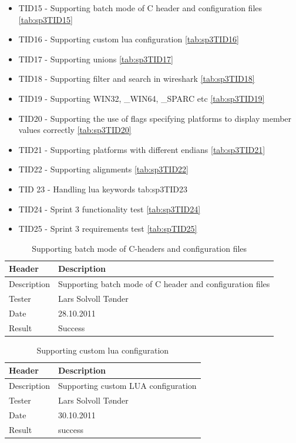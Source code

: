 \begin{itemize}
	\item TID15 - Supporting batch mode of C header and configuration files \autoref{tab:sp3TID15}
	\item TID16 - Supporting custom \Gls{lua} configuration \autoref{tab:sp3TID16}
	\item TID17 - Supporting unions \autoref{tab:sp3TID17}
	\item TID18 - Supporting filter and search in wireshark \autoref{tab:sp3TID18}
	\item TID19 - Supporting WIN32, \_WIN64, \_SPARC etc \autoref{tab:sp3TID19}
	\item TID20 -  Supporting the use of flags specifying platforms to display member values correctly \autoref{tab:sp3TID20}
	\item TID21 - Supporting platforms with different \glspl{endian} \autoref{tab:sp3TID21}
	\item TID22 - Supporting alignments \autoref{tab:sp3TID22}
	\item TID 23 - Handling \Gls{lua} keywords {tab:sp3TID23}
	\item TID24 - Sprint 3 functionality test \autoref{tab:sp3TID24}
	\item TID25 - Sprint 3 requirements test \autoref{tab:spTID25}
\end{itemize}

\begin{table}[!htb] \footnotesize \center
\caption{Supporting batch mode of C-headers and configuration files\label{tab:sp3TID15}}
\begin{tabular}{l l}
	\toprule
	Header & Description \\
	\midrule
	Description & Supporting batch mode of C header and configuration files \\
	Tester & Lars Solvoll Tønder \\
	Date & 28.10.2011 \\
	Result & Success\\
	\bottomrule
\end{tabular}
\end{table}

\begin{table}[!htb] \footnotesize \center
\caption{Supporting custom \Gls{lua} configuration\label{tab:sp3TID16}}
\begin{tabular}{l l}
	\toprule
	Header & Description \\
	\midrule
	Description & Supporting custom LUA configuration\\
	Tester & Lars Solvoll Tønder \\
	Date & 30.10.2011\\
	Result & success\\
	\bottomrule
\end{tabular}
\end{table}


